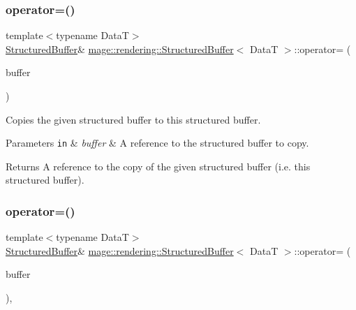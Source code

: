 \subsubsection{\texorpdfstring{operator=()}{operator=()}\hspace{0.1cm}{\footnotesize\ttfamily [1/2]}}
{\footnotesize\ttfamily template$<$typename DataT$>$ \\
\hyperlink{classmage_1_1rendering_1_1_structured_buffer}{Structured\+Buffer}\& \hyperlink{classmage_1_1rendering_1_1_structured_buffer}{mage\+::rendering\+::\+Structured\+Buffer}$<$ DataT $>$\+::operator= (\begin{DoxyParamCaption}\item[{const \hyperlink{classmage_1_1rendering_1_1_structured_buffer}{Structured\+Buffer}$<$ DataT $>$ \&}]{buffer }\end{DoxyParamCaption})\hspace{0.3cm}{\ttfamily [delete]}}

Copies the given structured buffer to this structured buffer.


\begin{DoxyParams}[1]{Parameters}
\mbox{\tt in}  & {\em buffer} & A reference to the structured buffer to copy. \\
\hline
\end{DoxyParams}
\begin{DoxyReturn}{Returns}
A reference to the copy of the given structured buffer (i.\+e. this structured buffer). 
\end{DoxyReturn}
\hypertarget{classmage_1_1rendering_1_1_structured_buffer_a488f44cb1e47689e5f7383ae8bdef823}{}\label{classmage_1_1rendering_1_1_structured_buffer_a488f44cb1e47689e5f7383ae8bdef823} 
\subsubsection{\texorpdfstring{operator=()}{operator=()}\hspace{0.1cm}{\footnotesize\ttfamily [2/2]}}
{\footnotesize\ttfamily template$<$typename DataT$>$ \\
\hyperlink{classmage_1_1rendering_1_1_structured_buffer}{Structured\+Buffer}\& \hyperlink{classmage_1_1rendering_1_1_structured_buffer}{mage\+::rendering\+::\+Structured\+Buffer}$<$ DataT $>$\+::operator= (\begin{DoxyParamCaption}\item[{\hyperlink{classmage_1_1rendering_1_1_structured_buffer}{Structured\+Buffer}$<$ DataT $>$ \&\&}]{buffer }\end{DoxyParamCaption})\hspace{0.3cm}{\ttfamily [default]}, {\ttfamily [noexcept]}}

